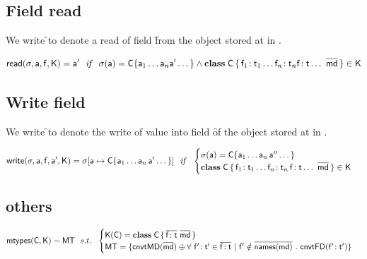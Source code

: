\documentclass[a4paper,USenglish]{tex/lipics-v2016}
\begin{document}
\subsection{Field read}

We write \readf\s\a\f\K to denote a read of field \f from the object
stored at \a in \s.

\begin{equation*}
\readf \s\a\f\K = \ap ~~\mathit{if}~~  \s(\a) = \obj\C{\a_1\dots\a_n \ap \dots} \AND
 \Class\C {\Fdef{\f_1}{\t_1}\dots\Fdef{\f_n}{\t_n}\Ftype\f\t\dots}{\b\md}\in\K
\end{equation*}

\subsection{Write field}

We write \setf\s\a\f\ap\K to denote the write of value \ap into field \f of
the object stored at \a in \s.

\begin{equation*}
\setf \s\a\f\ap\K= \Heap\s{\Bind{\a}{\obj\C{\a_1\dots\a_n\,\ap\dots}}}
  ~~\mathit{if}~~ \begin{cases}
   \s(\a) = \obj\C{\a_1\dots\a_n\,\app\dots}\\
   \Class\C{\Fdef{\f_1}{\t_1}\dots\Fdef{\f_n}{\t_n}\,\Fdef\f\t\dots}{\b\md}\in\K
\end{cases}
\end{equation*}




\subsection{others}


\hrulefill


\begin{equation*}
{\sf{mtypes}}({\sf{C}},{\sf{K}}) = {\sf{MT}} ~~s.t.~~ \begin{cases}

 {\sf{K}}({\sf{C}}) = {\sf{\bf class}}\;{\sf{C}}\,\{\,\overline{ {{\sf{f}}}\!:{{\sf{t}}} }~\overline{{\sf{md}}}\,\} \\
 {\sf{MT}} = \{{\sf{cnvtMD}}(\overline{{\sf{md}}}) \oplus \forall ~ {{\sf{ f'}}}\!:{ {\sf{t}}'}  \in \overline{ {{\sf{f}}}\!:{{\sf{t}}} } ~|~ {\sf{ f'}} \notin \overline{{\sf{names}}({\sf{md}})} ~.~ {\sf{cnvtFD}}( {{\sf{ f'}}}\!:{ {\sf{t}}'} )\}

\end{cases}
\end{equation*}
\end{document}
